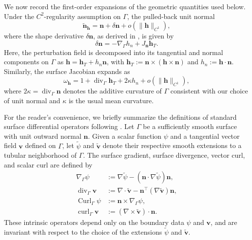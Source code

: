 \documentclass[10pt,a4paper]{amsart}
\numberwithin{equation}{section}
\begin{document}
We now record the first-order expansions of the geometric quantities used
below. Under the \(C^2\)-regularity assumption on \(\Gamma\), the pulled-back
unit normal
\[
\widetilde{\mathbf{n}}_{\mathbf{h}} = \mathbf{n} + \delta \mathbf{n} + o(\|\mathbf{h}\|_{C^1}),
\]
where the shape derivative $\delta \mathbf{n}$, as derived in \cite[Chap.~9, Eq.~(4.38)]{Delfour2011}, is given by
\begin{equation}\label{eq:normal_shape_derivative}
\delta \mathbf{n} = -\nabla_{\Gamma} h_n + J_{\mathbf{n}} \mathbf{h}_T.
\end{equation}
Here, the perturbation field is decomposed into its tangential and normal components on $\Gamma$ as $\mathbf{h} = \mathbf{h}_T + h_n \mathbf{n}$, with $\mathbf{h}_T := \mathbf{n} \times (\mathbf{h} \times \mathbf{n})$ and $h_n := \mathbf{h} \cdot \mathbf{n}$. Similarly, the surface Jacobian expands as
\begin{equation}\label{eq:surface_jacobian_expansion}
\omega_{\mathbf{h}} = 1 + \operatorname{div}_{\Gamma} \mathbf{h}_T + 2\kappa h_n + o(\|\mathbf{h}\|_{C^1}),
\end{equation}
where $2\kappa = \operatorname{div}_{\Gamma} \mathbf{n}$ denotes the additive  curvature of $\Gamma$ consistent with our choice of unit normal and $\kappa$ is the usual mean curvature.



For the reader's convenience, we briefly summarize the definitions of standard surface differential operators following \cite[Section~9.5]{Delfour2011}. Let $\Gamma$ be a sufficiently smooth surface with unit outward normal $\mathbf{n}$. Given a scalar function $\psi$ and a tangential vector field $\mathbf{v}$ defined on $\Gamma$, let $\widetilde{\psi}$ and $\widetilde{\mathbf{v}}$ denote their respective smooth extensions to a tubular neighborhood of $\Gamma$. The surface gradient, surface divergence, vector curl, and scalar curl are defined by
\begin{align*}
\nabla_\Gamma\psi &:= \nabla\widetilde\psi - (\mathbf{n}\cdot\nabla\widetilde\psi)\mathbf{n}, \\
\operatorname{div}_\Gamma\mathbf{v} &:= \nabla\cdot\widetilde{\mathbf{v}} - \mathbf{n}^\top(\nabla\widetilde{\mathbf{v}})\mathbf{n}, \\
\operatorname{Curl}_\Gamma\psi &:= \mathbf{n}\times\nabla_\Gamma\psi, \\
\operatorname{curl}_\Gamma\mathbf{v} &:= (\nabla\times\widetilde{\mathbf{v}})\cdot\mathbf{n}.
\end{align*}
These intrinsic operators depend only on the boundary data $\psi$ and $\mathbf{v}$, and are invariant with respect to the choice of the extensions $\widetilde{\psi}$ and $\widetilde{\mathbf{v}}$.
\end{document}
